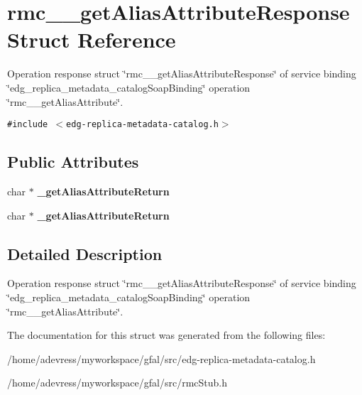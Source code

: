 \section{rmc\_\-\_\-get\-Alias\-Attribute\-Response Struct Reference}
\label{structrmc____getAliasAttributeResponse}
Operation response struct \char`\"{}rmc\_\-\_\-get\-Alias\-Attribute\-Response\char`\"{} of service binding \char`\"{}edg\_\-replica\_\-metadata\_\-catalog\-Soap\-Binding\char`\"{} operation \char`\"{}rmc\_\-\_\-get\-Alias\-Attribute\char`\"{}.  


{\tt \#include $<$edg-replica-metadata-catalog.h$>$}

\subsection*{Public Attributes}
\begin{CompactItemize}
\item 
char $\ast$ \textbf{\_\-get\-Alias\-Attribute\-Return}\label{structrmc____getAliasAttributeResponse_68915585e53b9c54c994ea0d29010e6e}

\item 
char $\ast$ \textbf{\_\-get\-Alias\-Attribute\-Return}\label{structrmc____getAliasAttributeResponse_68915585e53b9c54c994ea0d29010e6e}

\end{CompactItemize}


\subsection{Detailed Description}
Operation response struct \char`\"{}rmc\_\-\_\-get\-Alias\-Attribute\-Response\char`\"{} of service binding \char`\"{}edg\_\-replica\_\-metadata\_\-catalog\-Soap\-Binding\char`\"{} operation \char`\"{}rmc\_\-\_\-get\-Alias\-Attribute\char`\"{}. 



The documentation for this struct was generated from the following files:\begin{CompactItemize}
\item 
/home/adevress/myworkspace/gfal/src/edg-replica-metadata-catalog.h\item 
/home/adevress/myworkspace/gfal/src/rmc\-Stub.h\end{CompactItemize}

